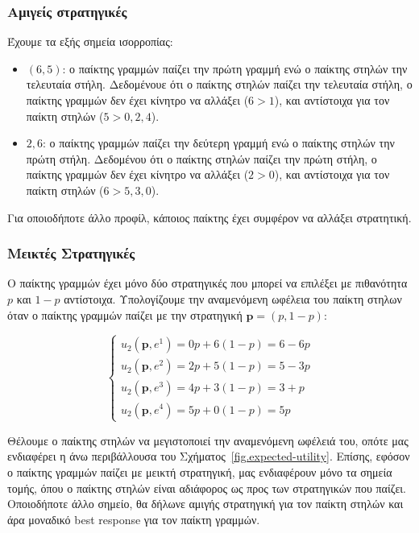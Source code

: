 \subsubsection*{Αμιγείς στρατηγικές}
Έχουμε τα εξής σημεία ισορροπίας:
\begin{itemize}
    \item $(6, 5)$: ο παίκτης γραμμών παίζει την πρώτη γραμμή ενώ ο παίκτης
        στηλών την τελευταία στήλη. Δεδομένουε ότι ο παίκτης στηλών παίζει την
        τελευταία στήλη, ο παίκτης γραμμών δεν έχει κίνητρο να αλλάξει ($6 >
        1$), και αντίστοιχα για τον παίκτη στηλών ($5 > 0, 2, 4$).
    \item $2, 6$: ο παίκτης γραμμών παίζει την δεύτερη γραμμή ενώ ο παίκτης
        στηλών την πρώτη στήλη. Δεδομένου ότι ο παίκτης στηλών παίζει την πρώτη
        στήλη, ο παίκτης γραμμών δεν έχει κίνητρο να αλλάξει ($2 > 0$), και
        αντίστοιχα για τον παίκτη στηλών ($6 > 5, 3, 0$).
\end{itemize}

Για οποιοδήποτε άλλο προφίλ, κάποιος παίκτης έχει συμφέρον να αλλάξει
στρατητική.

\subsubsection*{Μεικτές Στρατηγικές}
Ο παίκτης γραμμών έχει μόνο δύο στρατηγικές που μπορεί να επιλέξει με πιθανότητα
$p$ και $1-p$ αντίστοιχα. Υπολογίζουμε την αναμενόμενη ωφέλεια του παίκτη στηλων
όταν ο παίκτης γραμμών παίζει με την στρατηγική $\textbf{p} = (p, 1-p)$:

$$
\begin{cases}
    u_2(\textbf{p}, e^1) = 0p + 6 (1-p) = 6 - 6p    \\
    u_2(\textbf{p}, e^2) = 2p + 5 (1-p) = 5 - 3p    \\
    u_2(\textbf{p}, e^3) = 4p + 3 (1-p) = 3 + p     \\
    u_2(\textbf{p}, e^4) = 5p + 0 (1-p) = 5p
\end{cases}
$$

Θέλουμε ο παίκτης στηλών να μεγιστοποιεί την αναμενόμενη ωφέλειά του, οπότε μας
ενδιαφέρει η άνω περιβάλλουσα του Σχήματος~\ref{fig.expected-utility}. Επίσης,
εφόσον ο παίκτης γραμμών παίζει με μεικτή στρατηγική, μας ενδιαφέρουν μόνο τα
σημεία τομής, όπου ο παίκτης στηλών είναι αδιάφορος ως προς των στρατηγικών που
παίζει. Οποιοδήποτε άλλο σημείο, θα δήλωνε αμιγής στρατηγική για τον παίκτη
στηλών και άρα μοναδικό best response για τον παίκτη γραμμών.

